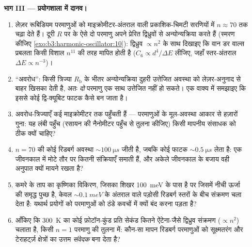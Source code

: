 \begin{problem}
\medskip\noindent\textbf{भाग III --- प्रयोगशाला में दानव।}
\begin{enumerate}[resume]
  \item लेज़र रूबिडियम परमाणुओं को माइक्रोमीटर-अंतराल वाली
        प्रकाशिक-चिमटी सरणियों में $n \approx 70$ तक चढ़ा देते हैं।
        दूरी $R$ पर के ऐसे दो परमाणु अपने प्रेरित द्विध्रुवों से
        अन्योन्यक्रिया करते हैं (स्मरण कीजिए
        \cref{exo:b3:harmonic-oscillator:10}): द्विध्रुव
        $\propto n^2$ के साथ दिखाइए कि वान डर वाल्स प्रबलता किसी
        विशाल $n^{11}$ की तरह मापित होती है ($C_6 \propto d^4/\Delta E$
        लीजिए, जहाँ स्तर-अंतराल $\Delta E \propto n^{-3}$)।
  \item ``अवरोध'': किसी त्रिज्या $R_{\text{b}}$ के भीतर
        अन्योन्यक्रिया दुहरी उत्तेजित अवस्था को लेज़र-अनुनाद से बाहर
        खिसका देती है, अतः \emph{दो} परमाणु एक साथ उत्तेजित नहीं हो
        सकते। एक वाक्य में समझाइए कि इससे कोई द्वि-क्यूबिट फाटक कैसे
        बन जाता है।
  \item अवरोध-त्रिज्याएँ कई माइक्रोमीटर तक पहुँचती हैं --- परमाणुओं
        के मूल-अवस्था आकार से हज़ारों गुना: यह लंबी पहुँच
        (रसायन की नैनोमीटर पहुँच से तुलना कीजिए)
        किसी मापनीय संसाधक को ठीक क्यों चाहिए?
  \item $n = 70$ की कोई रिडबर्ग अवस्था $\sim\qty{100}{\micro s}$
        जीती है, जबकि कोई फाटक $\sim\qty{0.5}{\micro s}$ लेता है:
        एक जीवनकाल में मोटे तौर पर कितनी संक्रियाएँ समाती हैं, और
        अकेले जीवनकाल के बजाय वही अनुपात क्यों मायने रखता है?
  \item कमरे के ताप का कृष्णिका विकिरण, जिसका शिखर
        \qty{100}{meV} के पास है पर जिसमें नीची ऊर्जा की समृद्ध पुच्छ
        है, केवल $\sim\qty{0.1}{meV}$ के अंतराल वाले पड़ोसी रिडबर्ग
        स्तरों के बीच संक्रमण चला देता है: यथार्थ प्रयोगों को
        परमाणुओं को ठंडे कवचों में क्यों बंद करना पड़ता है?
  \item आँकिए कि \qty{300}{K} का कोई फ़ोटॉन-कुंड प्रति सेकंड कितने
        ऐंटेना-जैसे द्विध्रुव संक्रमण ($\propto n^2$) चलाता है,
        किसी $n = 1$ परमाणु की तुलना में: कौन-सा मापन रिडबर्ग
        परमाणुओं को सूक्ष्मतरंग और टेराहर्ट्ज़ क्षेत्रों का उत्तम
        \emph{संवेदक} बना देता है?
\end{enumerate}


\end{problem}
